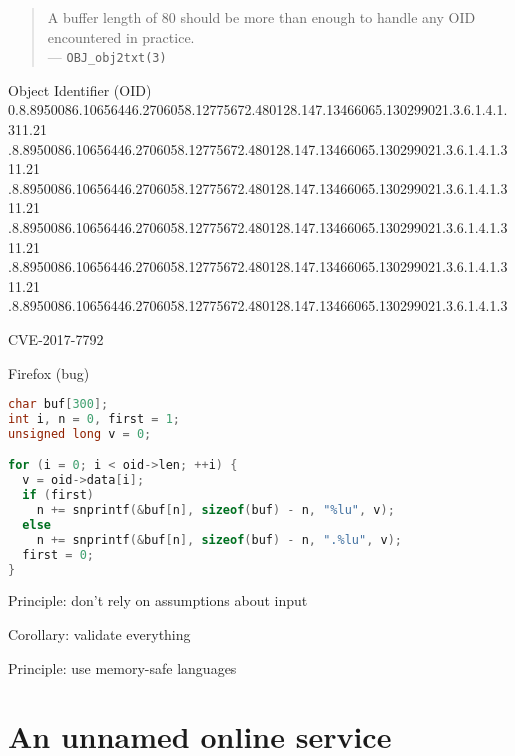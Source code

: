 \documentclass[ignorenonframetext,aspectratio=169,dvipsnames]{beamer}
\begin{document}
\begin{frame}
\Large
\begin{quote}
A buffer length of 80 should be more than enough to
handle any OID encountered in practice.\\
{\hfill --- \tt OBJ\_obj2txt(3)}
\end{quote}
\end{frame}

\begin{frame}{Object Identifier (OID)}
  0.8.8950086.10656446.2706058.12775672.480128.147.13466065.130299021.3.6.1.4.1.311.21
   .8.8950086.10656446.2706058.12775672.480128.147.13466065.130299021.3.6.1.4.1.311.21
   .8.8950086.10656446.2706058.12775672.480128.147.13466065.130299021.3.6.1.4.1.311.21
   .8.8950086.10656446.2706058.12775672.480128.147.13466065.130299021.3.6.1.4.1.311.21
   .8.8950086.10656446.2706058.12775672.480128.147.13466065.130299021.3.6.1.4.1.311.21
   .8.8950086.10656446.2706058.12775672.480128.147.13466065.130299021.3.6.1.4.1.3
\end{frame}

\begin{frame}[plain]
\huge
CVE-2017-7792
\end{frame}

\begin{frame}[fragile]{Firefox (bug)}
\begin{lstlisting}[language=C++]
char buf[300];
int i, n = 0, first = 1;
unsigned long v = 0;

for (i = 0; i < oid->len; ++i) {
  v = oid->data[i];
  if (first)
    n += snprintf(&buf[n], sizeof(buf) - n, "%lu", v);
  else
    n += snprintf(&buf[n], sizeof(buf) - n, ".%lu", v);
  first = 0;
}
\end{lstlisting}
\end{frame}

\begin{frame}[plain]
\huge
Principle: don't rely on assumptions about input
\pause

\Large Corollary: validate everything
\end{frame}


\begin{frame}[plain]
\huge
Principle: use memory-safe languages
\end{frame}





\section{An unnamed online service}\label{unnamed}
\end{document}
